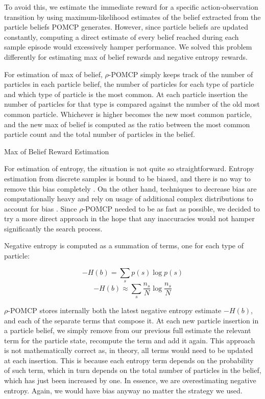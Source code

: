 To avoid this, we estimate the immediate reward for a specific action-observation transition by
using maximum-likelihood estimates of the belief extracted from the particle beliefs POMCP
generates. However, since particle beliefs are updated constantly, computing a direct estimate of
every belief reached during each sample episode would excessively hamper performance. We solved this
problem differently for estimating max of belief rewards and negative entropy rewards.

For estimation of max of belief, $\rho$-POMCP simply keeps track of the number of particles in each
particle belief, the number of particles for each type of particle and which type of particle is the
most common. At each particle insertion the number of particles for that type is compared against
the number of the old most common particle. Whichever is higher becomes the new most common
particle, and the new max of belief is computed as the ratio between the most common particle count
and the total number of particles in the belief.

\begin{algorithm}[H]
    \caption{Max of Belief Reward Estimation}

\end{algorithm}

For estimation of entropy, the situation is not quite so straightforward. Entropy estimation from
discrete samples is bound to be biased, and there is no way to remove this bias completely
\cite{cit:badentropy}. On the other hand, techniques to decrease bias are computationally heavy and
rely on usage of additional complex distributions to account for bias \cite{cit:entropyfixes}.
Since $\rho$-POMCP needed to be as fast as possible, we decided to try a more direct approach in the
hope that any inaccuracies would not hamper significantly the search process.

Negative entropy is computed as a summation of terms, one for each type of particle:

\[ -H(b) = \sum_s p(s) \log p(s) \]
\[ -H(b) \approx \sum_s \frac{n_s}{N} \log \frac{n_s}{N} \]

$\rho$-POMCP stores internally both the latest negative entropy estimate $-H(b)$, and each of the
separate terms that compose it. At each new particle insertion in a particle belief, we simply
remove from our previous full estimate the relevant term for the particle state, recompute the term
and add it again. This approach is not mathematically correct as, in theory, all terms would need to
be updated at each insertion. This is because each entropy term depends on the probability of such
term, which in turn depends on the total number of particles in the belief, which has just been
increased by one. In essence, we are overestimating negative entropy. Again, we would have bias
anyway no matter the strategy we used.

